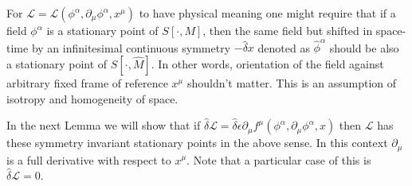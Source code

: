 \documentclass[main.tex]{subfiles}
\begin{document}
For $\mathcal{L} = \mathcal{L}(\phi^\alpha, \partial_\mu \phi^\alpha, x^\mu)$ to have physical meaning one might require that if a field $\phi^\alpha$ is a stationary point of $S[\cdot, M]$, then the same field but shifted in space-time by an infinitesimal continuous symmetry $-\hat{\delta}x$ denoted as $\hat{\phi}^\alpha$ should be also a stationary point of $S[\cdot, \hat{M}]$. In other words, orientation of the field against arbitrary fixed frame of reference $x^\mu$ shouldn't matter. This is an assumption of isotropy and homogeneity of space.

In the next Lemma we will show that if $\hat{\delta} \mathcal{L} = \hat{\delta} \epsilon \partial_\mu f^\mu(\phi^\alpha, \partial_\mu \phi^\alpha, x)$ then $\mathcal{L}$ has these symmetry invariant stationary points in the above sense. In this context $\partial_\mu$ is a full derivative with respect to $x^\mu$. Note that a particular case of this is $\hat{\delta} \mathcal{L} = 0$.
\end{document}
